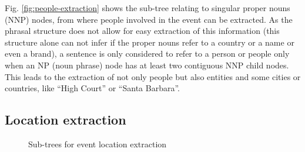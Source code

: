 \documentclass{llncs}
\begin{document}
Fig. \ref{fig:people-extraction} shows the sub-tree relating to singular proper nouns (NNP) nodes, from where people involved in the event can be extracted. As the phrasal structure does not allow for easy extraction of this information (this structure alone can not infer if the proper nouns refer to a country or a name or even a brand), a sentence is only considered to refer to a person or people only when an NP (noun phrase) node has at least two contiguous NNP child nodes. This leads to the extraction of not only people but also entities and some cities or countries, like ``High Court'' or ``Santa Barbara''.

\newpage
\subsection{Location extraction}
\label{subsec:approach:location-extraction}

\begin{figure}[h!]
	\centering
	\hspace{20mm}
	\caption{Sub-trees for event location extraction}
	\label{fig:location-extraction}
\end{figure}
\end{document}
